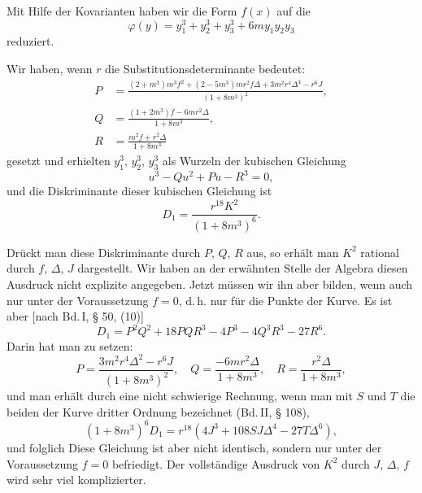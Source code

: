 Mit Hilfe der Kovarianten haben wir die Form $f(x)$ auf die
\[
\varphi(y) = y_1^3+y_2^3+y_3^3+6my_1y_2y_3
\]
reduziert.

Wir haben, wenn $r$ die Substitutionsdeterminante bedeutet:
\begin{align*}
P &= \frac{(2+m^3)m^3f^2+(2-5m^3)mr^2f\Delta+3m^2r^4\Delta^4-r^6J}{(1+8m^3)^2}, %
\\
Q &= \frac{(1+2m^3)f-6mr^2\Delta}{1+8m^3}, \\
R &= \frac{m^2f+r^2\Delta}{1+8m^3}
\end{align*}
gesetzt und erhielten $y_1^3$, $y_2^3$, $y_3^3$ als Wurzeln der kubischen
Gleichung
\[
u^3-Qu^2+Pu-R^3=0,
\]
und die Diskriminante dieser kubischen Gleichung ist
\[
D_1 = \frac{r^{18}K^2}{(1+8m^3)^6}.
\]

Drückt man diese Diskriminante durch $P$, $Q$, $R$ aus, so erhält
man $K^2$ rational durch $f$, $\Delta$, $J$ dargestellt. Wir haben an der
erwähnten Stelle der Algebra diesen Ausdruck nicht explizite angegeben. Jetzt müssen wir ihn aber bilden, wenn auch nur unter
der Voraussetzung $f=0$, d.\,h. nur für die Punkte der Kurve.
Es ist aber [nach Bd.\,I, § 50, (10)]
\[
D_1 = P^2Q^2+18PQR^3-4P^3-4Q^3R^3-27R^6.
\]
Darin hat man zu setzen:
\[
P = \frac{3m^2r^4\Delta^2-r^6J}{(1+8m^3)^2}, \quad Q = \frac{-6mr^2\Delta}{1+8m^3}, \quad R = \frac{r^2\Delta}{1+8m^3},
\]
und man erhält durch eine nicht schwierige Rechnung, wenn man
mit $S$ und $T$ die beiden  der Kurve dritter Ordnung
bezeichnet (Bd.\,II, § 108),
\[
(1+8m^3)^6D_1 = r^{18}(4J^3+108SJ\Delta^4-27T\Delta^6),
\]
und folglich
Diese Gleichung ist aber nicht identisch, sondern nur unter
der Voraussetzung $f=0$ befriedigt. Der vollständige Ausdruck
von $K^2$ durch $J$, $\Delta$, $f$ wird sehr viel komplizierter.
